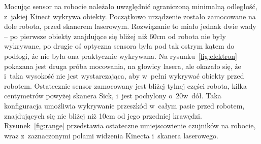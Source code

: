 Mocując sensor na robocie należało uwzględnić ograniczoną minimalną odległość,
z~jakiej Kinect wykrywa obiekty. Początkowo urządzenie zostało zamocowane na
dole robota, przed skanerem laserowym. Rozwiązanie to miało jednak dwie wady --
po pierwsze obiekty znajdujące się bliżej niż 60cm od robota nie były
wykrywane, po drugie oś optyczna sensora była pod tak ostrym kątem do podłogi,
że nie była ona praktycznie wykrywana. Na rysunku~\ref{fig:elektron} pokazana
jest druga próba mocowania, na głowicy lasera, ale okazało się, że i~taka
wysokość nie jest wystarczająca, aby w~pełni wykrywać obiekty przed robotem.
Ostatecznie sensor zamocowany jest bliżej tylnej części robota, kilka
centymetrów powyżej skanera Sick, i~jest pochylony o~20\textdegree w~dół. Taka
konfiguracja umożliwia wykrywanie przeszkód w~całym pasie przed robotem,
znajdujących się nie bliżej niż 10cm od jego przedniej krawędzi.
Rysunek~\ref{fig:range} przedstawia ostateczne umiejscowienie czujników
na robocie, wraz z~zaznaczonymi polami widzenia Kinecta i~skanera laserowego.



